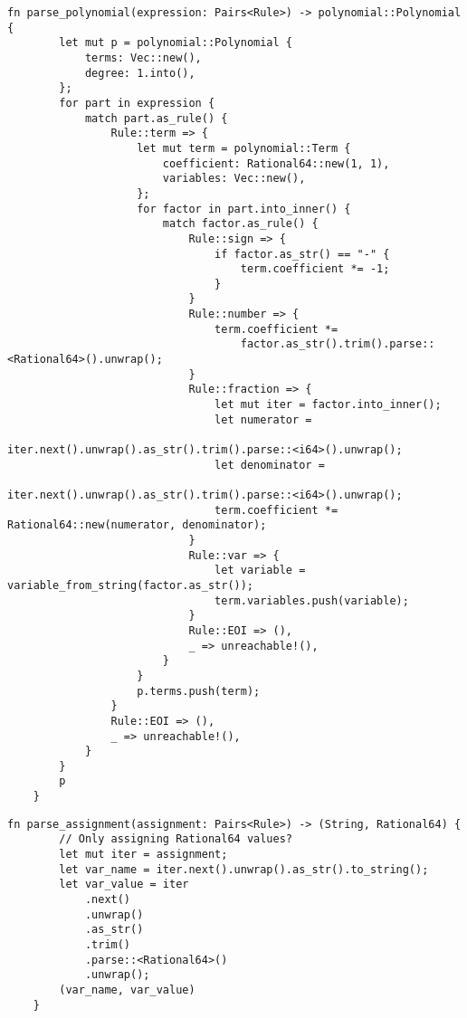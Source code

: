 \begin{lstlisting}[caption={The implementation of the \texttt{parse\_polynomial()} function}, label={lst:parse-polynomial}]
    fn parse_polynomial(expression: Pairs<Rule>) -> polynomial::Polynomial {
        let mut p = polynomial::Polynomial {
            terms: Vec::new(),
            degree: 1.into(),
        };
        for part in expression {
            match part.as_rule() {
                Rule::term => {
                    let mut term = polynomial::Term {
                        coefficient: Rational64::new(1, 1),
                        variables: Vec::new(),
                    };
                    for factor in part.into_inner() {
                        match factor.as_rule() {
                            Rule::sign => {
                                if factor.as_str() == "-" {
                                    term.coefficient *= -1;
                                }
                            }
                            Rule::number => {
                                term.coefficient *=
                                    factor.as_str().trim().parse::<Rational64>().unwrap();
                            }
                            Rule::fraction => {
                                let mut iter = factor.into_inner();
                                let numerator =
                                    iter.next().unwrap().as_str().trim().parse::<i64>().unwrap();
                                let denominator =
                                    iter.next().unwrap().as_str().trim().parse::<i64>().unwrap();
                                term.coefficient *= Rational64::new(numerator, denominator);
                            }
                            Rule::var => {
                                let variable = variable_from_string(factor.as_str());
                                term.variables.push(variable);
                            }
                            Rule::EOI => (),
                            _ => unreachable!(),
                        }
                    }
                    p.terms.push(term);
                }
                Rule::EOI => (),
                _ => unreachable!(),
            }
        }
        p
    }
\end{lstlisting}

\begin{lstlisting}[caption={The implementation of the \texttt{parse\_assignment()} function}, label={lst:parse-assignment}]
    fn parse_assignment(assignment: Pairs<Rule>) -> (String, Rational64) {
        // Only assigning Rational64 values?
        let mut iter = assignment;
        let var_name = iter.next().unwrap().as_str().to_string();
        let var_value = iter
            .next()
            .unwrap()
            .as_str()
            .trim()
            .parse::<Rational64>()
            .unwrap();
        (var_name, var_value)
    }
\end{lstlisting}

